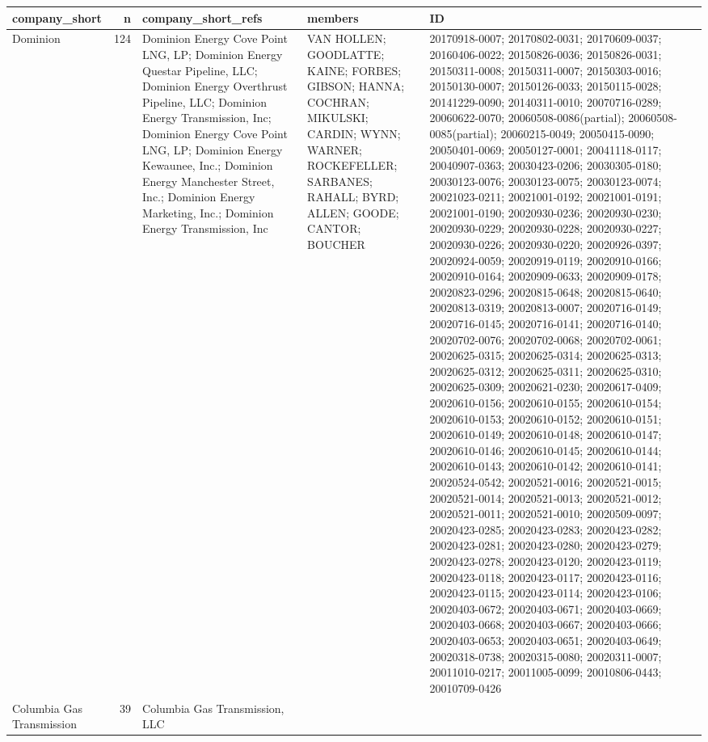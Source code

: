\documentclass[]{article}
\begin{document}
\begin{longtable}[]{@{}lrlll@{}}
\toprule
company\_short & n & company\_short\_refs & members & ID\tabularnewline
\midrule
\endhead
Dominion & 124 & Dominion Energy Cove Point LNG, LP; Dominion Energy
Questar Pipeline, LLC; Dominion Energy Overthrust Pipeline, LLC;
Dominion Energy Transmission, Inc; Dominion Energy Cove Point LNG, LP;
Dominion Energy Kewaunee, Inc.; Dominion Energy Manchester Street, Inc.;
Dominion Energy Marketing, Inc.; Dominion Energy Transmission, Inc & VAN
HOLLEN; GOODLATTE; KAINE; FORBES; GIBSON; HANNA; COCHRAN; MIKULSKI;
CARDIN; WYNN; WARNER; ROCKEFELLER; SARBANES; RAHALL; BYRD; ALLEN; GOODE;
CANTOR; BOUCHER & 20170918-0007; 20170802-0031; 20170609-0037;
20160406-0022; 20150826-0036; 20150826-0031; 20150311-0008;
20150311-0007; 20150303-0016; 20150130-0007; 20150126-0033;
20150115-0028; 20141229-0090; 20140311-0010; 20070716-0289;
20060622-0070; 20060508-0086(partial); 20060508-0085(partial);
20060215-0049; 20050415-0090; 20050401-0069; 20050127-0001;
20041118-0117; 20040907-0363; 20030423-0206; 20030305-0180;
20030123-0076; 20030123-0075; 20030123-0074; 20021023-0211;
20021001-0192; 20021001-0191; 20021001-0190; 20020930-0236;
20020930-0230; 20020930-0229; 20020930-0228; 20020930-0227;
20020930-0226; 20020930-0220; 20020926-0397; 20020924-0059;
20020919-0119; 20020910-0166; 20020910-0164; 20020909-0633;
20020909-0178; 20020823-0296; 20020815-0648; 20020815-0640;
20020813-0319; 20020813-0007; 20020716-0149; 20020716-0145;
20020716-0141; 20020716-0140; 20020702-0076; 20020702-0068;
20020702-0061; 20020625-0315; 20020625-0314; 20020625-0313;
20020625-0312; 20020625-0311; 20020625-0310; 20020625-0309;
20020621-0230; 20020617-0409; 20020610-0156; 20020610-0155;
20020610-0154; 20020610-0153; 20020610-0152; 20020610-0151;
20020610-0149; 20020610-0148; 20020610-0147; 20020610-0146;
20020610-0145; 20020610-0144; 20020610-0143; 20020610-0142;
20020610-0141; 20020524-0542; 20020521-0016; 20020521-0015;
20020521-0014; 20020521-0013; 20020521-0012; 20020521-0011;
20020521-0010; 20020509-0097; 20020423-0285; 20020423-0283;
20020423-0282; 20020423-0281; 20020423-0280; 20020423-0279;
20020423-0278; 20020423-0120; 20020423-0119; 20020423-0118;
20020423-0117; 20020423-0116; 20020423-0115; 20020423-0114;
20020423-0106; 20020403-0672; 20020403-0671; 20020403-0669;
20020403-0668; 20020403-0667; 20020403-0666; 20020403-0653;
20020403-0651; 20020403-0649; 20020318-0738; 20020315-0080;
20020311-0007; 20011010-0217; 20011005-0099; 20010806-0443;
20010709-0426\tabularnewline
Columbia Gas Transmission & 39 & Columbia Gas Transmission, LLC &

\end{longtable}
\end{document}
